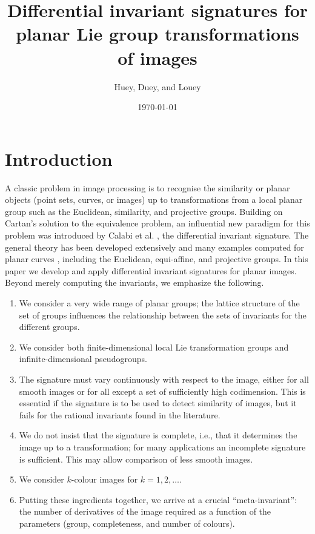 \documentclass{article}
\title{Differential invariant signatures for planar Lie group transformations of
images}
\date{\today}
\author{Huey, Duey, and Louey}
\begin{document}
\maketitle




\section{Introduction}

A classic problem in image processing is to recognise the similarity or planar objects (point sets, curves, or images) up to transformations from a local planar group such as the Euclidean, similarity, and projective groups. Building on Cartan's solution to the equivalence problem, an influential new paradigm for this problem was introduced by Calabi et al. \cite{calabi98}, the differential invariant signature. The general theory has been developed extensively \cite{} and many examples computed for planar curves \cite{}, including the Euclidean, equi-affine, and projective groups. In this paper we develop and apply differential invariant signatures for planar images. Beyond merely computing the invariants, we emphasize the following.
\begin{enumerate}
\item We consider a very wide range of planar groups; the lattice structure of the set of groups influences
the relationship between the sets of invariants for the different groups.
\item We consider both finite-dimensional local Lie transformation groups and infinite-dimensional pseudogroups.
\item The signature must vary continuously with respect to the image, either for all smooth images or for all except
a set of sufficiently high codimension. This is essential if the signature is to be used to detect similarity of images, but it fails for the rational invariants found in the literature.
\item We do not insist that the signature is complete, i.e., that it  determines the image up to a transformation; for many applications an incomplete signature is sufficient. This may allow comparison of less smooth images.
\item We consider $k$-colour images for $k=1,2,\dots$. 
\item Putting these ingredients together, we arrive at a crucial ``meta-invariant'': the number of derivatives
of the image required as a function of the parameters (group, completeness, and number of colours).
\end{enumerate}
\end{document}

